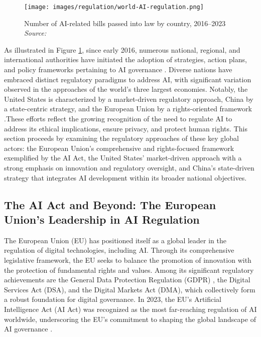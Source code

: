 \begin{figure}[h!]
    \centering
    \texttt{[image: images/regulation/world-AI-regulation.png]}
    \caption{Number of AI-related bills passed into law by country, 2016–2023 \textit{Source:} \cite{maslej2024ai}}
    \label{fig:AI_regulations_world}
\end{figure}

As illustrated in Figure \ref{fig:AI_regulations_world}, since early 2016, numerous national, regional, and international authorities have initiated the adoption of strategies, action plans, and policy frameworks pertaining to AI governance \cite{berryhill2019hello}. Diverse nations have embraced distinct regulatory paradigms to address AI, with significant variation observed in the approaches of the world’s three largest economies. Notably, the United States is characterized by a market-driven regulatory approach, China by a state-centric strategy, and the European Union by a rights-oriented framework \cite{allen2023race}.These efforts reflect the growing recognition of the need to regulate AI to address its ethical implications, ensure privacy, and protect human rights. This section proceeds by examining the regulatory approaches of these key global actors: the European Union’s comprehensive and rights-focused framework exemplified by the AI Act, the United States’ market-driven approach with a strong emphasis on innovation and regulatory oversight, and China’s state-driven strategy that integrates AI development within its broader national objectives.

\subsection{The AI Act and Beyond: The European Union's Leadership in AI Regulation}

The European Union (EU) has positioned itself as a global leader in the regulation of digital technologies, including AI. Through its comprehensive legislative framework, the EU seeks to balance the promotion of innovation with the protection of fundamental rights and values. Among its significant regulatory achievements are the General Data Protection Regulation (GDPR) \cite{cepr_gdpr_2023}, the Digital Services Act (DSA), and the Digital Markets Act (DMA), which collectively form a robust foundation for digital governance. In 2023, the EU's Artificial Intelligence Act (AI Act) was recognized as the most far-reaching regulation of AI worldwide, underscoring the EU's commitment to shaping the global landscape of AI governance \cite{nyt_europe_ai_regulation_2023}.

